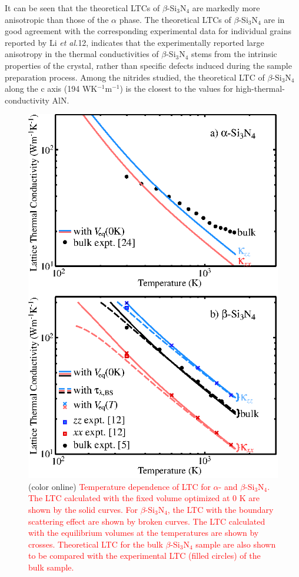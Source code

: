 \documentclass[twocolumn,amsmath,amssymb,a4paper,prb,superscriptaddress,floatfix]{revtex4-1}
\begin{document}
It can be seen that the theoretical LTCs of $\beta$-Si$_3$N$_4$ are
markedly more anisotropic than those of the $\alpha$ phase. The
theoretical LTCs of $\beta$-Si$_3$N$_4$ are in good agreement with the
corresponding experimental data for individual grains reported by Li
{\it et al.}12, indicates that the experimentally reported large
anisotropy in the thermal conductivities of $\beta$-Si$_3$N$_4$ stems
from the intrinsic properties of the crystal, rather than specific
defects induced during the sample preparation process. Among the
nitrides studied, the theoretical LTC of $\beta$-Si$_3$N$_4$ along the c
axis (194 WK$^{-1}$m$^{-1}$) is the closest to the values for
high-thermal-conductivity AlN.

\begin{figure}[ht]
 \begin{center}
  \includegraphics[width=0.90\linewidth]{Fig1.eps} \caption{(color
  online) \textcolor{red}{Temperature dependence of LTC for $\alpha$-
  and $\beta$-Si$_3$N$_4$. The LTC calculated with the fixed volume
  optimized at 0 K are shown by the solid curves. For
  $\beta$-Si$_3$N$_4$, the LTC with the boundary scattering effect are
  shown by broken curves. The LTC calculated with the equilibrium
  volumes at the temperatures are shown by crosses. Theoretical LTC for
  the bulk $\beta$-Si$_3$N$_4$ sample are also shown to be compared with
  the experimental LTC (filled circles) of the bulk sample.}
  \label{fig:Fig1_338} }
 \end{center}
\end{figure}
\end{document}

